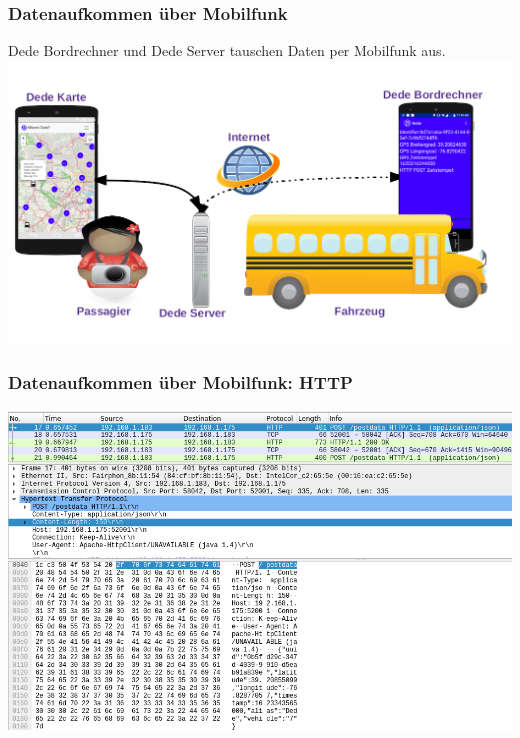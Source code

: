 
\begin{frame}
  \frametitle{Datenaufkommen über Mobilfunk}
  Dede Bordrechner und Dede Server tauschen Daten per Mobilfunk aus.
  \includegraphics[width=\paperwidth]{dede/dede-concept}
\end{frame}

\begin{frame}
  \frametitle{Datenaufkommen über Mobilfunk: HTTP}
  \includegraphics[width=0.88\paperwidth]{dede/dede-obc-wireshark-http-post}
\end{frame}

